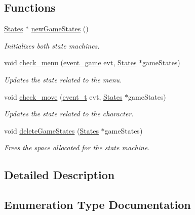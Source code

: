 \subsection*{Functions}
\begin{DoxyCompactItemize}
\item 
\hyperlink{struct_states}{States} $\ast$ \hyperlink{group___state_machine_ga1b7814c2c4e8169a8561d47554c0639e}{new\+Game\+States} ()
\begin{DoxyCompactList}\small\item\em Initializes both state machines. \end{DoxyCompactList}\item 
void \hyperlink{group___state_machine_ga721160d2b84b87f2f8a78aa35978eb59}{check\+\_\+menu} (\hyperlink{group___state_machine_gafd7a2b0489d2d98e27f1311944de7b30}{event\+\_\+game} evt, \hyperlink{struct_states}{States} $\ast$game\+States)
\begin{DoxyCompactList}\small\item\em Updates the state related to the menu. \end{DoxyCompactList}\item 
void \hyperlink{group___state_machine_ga993a672fc77bafce6ec7ef9db4008071}{check\+\_\+move} (\hyperlink{group___state_machine_ga2fb9b58e4e5f14f40af8b4a1425841f8}{event\+\_\+t} evt, \hyperlink{struct_states}{States} $\ast$game\+States)
\begin{DoxyCompactList}\small\item\em Updates the state related to the character. \end{DoxyCompactList}\item 
void \hyperlink{group___state_machine_gad70668a1c3bdf581906790c7e7da0409}{delete\+Game\+States} (\hyperlink{struct_states}{States} $\ast$game\+States)
\begin{DoxyCompactList}\small\item\em Frees the space allocated for the state machine. \end{DoxyCompactList}\end{DoxyCompactItemize}


\subsection{Detailed Description}


\subsection{Enumeration Type Documentation}
\mbox{\label{group___state_machine_gafd7a2b0489d2d98e27f1311944de7b30}} 
